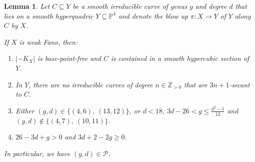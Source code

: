 \documentclass[english,11pt,reqno]{amsart}
\newcommand{\sub}{\subseteq}
\newcommand{\Pfour}{\mathbb{P}^4}
\newcommand{\Z}{\mathbb{Z}}
\newtheorem{lem}[thm]{Lemma}
\begin{document}
\begin{lem} \label{lem:general_case_weak_Fano_implies_in_list}
Let $C \sub Y$ be a smooth irreducible curve of genus $g$ and degree $d$ that lies on a smooth hyperquadric $Y \sub \Pfour$ and denote the blow up $\pi:X\rightarrow Y$ of $Y$ along $C$ by $X$. \par 
If $X$ is weak Fano, then:
\begin{enumerate}[label=\textup{(\arabic*)}]
\item $|-K_X|$ is base-point-free and $C$ is contained in a smooth hypercubic section of $Y$.
\item In $Y$, there are no irreducible curves of degree $n\in \Z_{>0}$ that are $3n+1$-secant to $C$.
\item Either $(g,d)\in \{(4,6),\:(13,12)\}$, or $d < 18$, $3d-26<g\leq\frac{d^2-1}{12}$ and $(g,d)\not \in \{(4,7),\:(10, 11)\}$.
\item $26-3d+g>0$ and $3d+2-2g\geq0$.
\end{enumerate}	
In particular, we have $(g,d)\in \mathcal{P}$. 
\end{lem}
%
%
\end{document}
